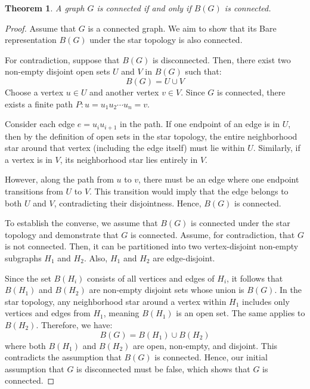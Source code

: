 \documentclass{amsart}
\newtheorem{theorem}{Theorem}[section]
\theoremstyle{definition}
\theoremstyle{remark}
\numberwithin{equation}{section}
\begin{document}
	\begin{theorem}
		A graph \(G\) is connected if and only if \(B(G)\) is connected.
	\end{theorem}
	\begin{proof}
		Assume that \( G \) is a connected graph. We aim to show that its Bare representation
		\(
		B(G) \) under
		the star topology is also connected.
		
		For contradiction, suppose that \( B(G) \) is disconnected. Then, there exist two
		non-empty disjoint
		open sets \( U \) and \( V \) in \( B(G) \) such that:
		\[
		B(G) = U \cup V
		\]
		Choose a vertex \( u \in U \) and another vertex \( v \in V \). Since \( G \) is
		connected, there
		exists a finite path \( P: u = u_1u_2 \cdots u_n = v \).
		
		Consider each edge \( e = u_iu_{i+1} \) in the path. If one endpoint of an edge
		is
		in \( U \), then
		by the definition of open sets in the star topology, the entire neighborhood star
		around that vertex
		(including the edge itself) must lie within \( U \). Similarly, if a vertex is in
		\(
		V \), its
		neighborhood star lies entirely in \( V \).
		
		However, along the path from \( u \) to \( v \), there must be an edge where one
		endpoint
		transitions from \( U \) to \( V \). This transition would imply that the edge
		belongs to both \( U
		\) and \( V \), contradicting their disjointness. Hence, \( B(G) \) is connected.
		
		To establish the converse, we assume that \( B(G) \) is connected under the star
		topology and demonstrate that \( G \) is connected. Assume, for contradiction, that \( G \) is not connected. Then, it can be partitioned into two vertex-disjoint non-empty
		subgraphs \( H_1 \) and \( H_2 \). Also, \( H_1 \) and \( H_2 \) are edge-disjoint.
		
		Since the set \( B(H_i) \) consists of all vertices and edges of \( H_i \), it follows that \( B(H_1) \) and \( B(H_2) \) are non-empty disjoint sets whose union is $B(G)$. In the star topology, any neighborhood star around a vertex	within \( H_1 \) includes only vertices and edges from \( H_1 \), meaning \( B(H_1) \) is an open set. The same applies to \( B(H_2) \). Therefore, we have:
		\[
		B(G) = B(H_1) \cup B(H_2)
		\]
		where both \( B(H_1) \) and \( B(H_2) \) are open, non-empty, and disjoint. This contradicts the assumption that \( B(G) \) is connected. Hence, our initial assumption that \( G \) is disconnected must be false, which shows that \( G \) is connected.
	\end{proof}
	
\end{document}
